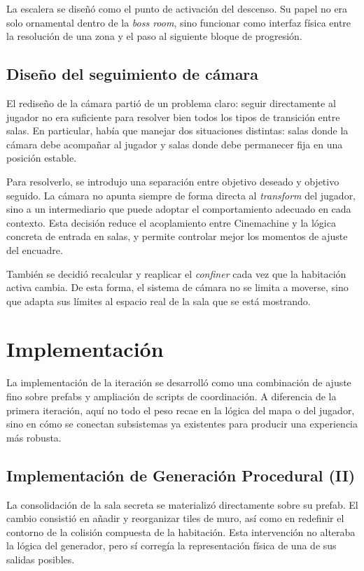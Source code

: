 La escalera se diseñó como el punto de activación del descenso. Su papel no era solo
ornamental dentro de la \textit{boss room}, sino funcionar como interfaz física entre la
resolución de una zona y el paso al siguiente bloque de progresión.

\subsection{Diseño del seguimiento de cámara}
El rediseño de la cámara partió de un problema claro: seguir directamente al jugador no era
suficiente para resolver bien todos los tipos de transición entre salas. En particular,
había que manejar dos situaciones distintas: salas donde la cámara debe acompañar al
jugador y salas donde debe permanecer fija en una posición estable.

Para resolverlo, se introdujo una separación entre objetivo deseado y objetivo seguido. La
cámara no apunta siempre de forma directa al \textit{transform} del jugador, sino a un
intermediario que puede adoptar el comportamiento adecuado en cada contexto. Esta decisión
reduce el acoplamiento entre Cinemachine y la lógica concreta de entrada en salas, y
permite controlar mejor los momentos de ajuste del encuadre.

También se decidió recalcular y reaplicar el \textit{confiner} cada vez que la habitación
activa cambia. De esta forma, el sistema de cámara no se limita a moverse, sino que adapta
sus límites al espacio real de la sala que se está mostrando.

\section{Implementación}
La implementación de la iteración se desarrolló como una combinación de ajuste fino sobre
prefabs y ampliación de scripts de coordinación. A diferencia de la primera iteración, aquí
no todo el peso recae en la lógica del mapa o del jugador, sino en cómo se conectan
subsistemas ya existentes para producir una experiencia más robusta.

\subsection{Implementación de Generación Procedural (II)}
La consolidación de la sala secreta se materializó directamente sobre su prefab. El cambio
consistió en añadir y reorganizar tiles de muro, así como en redefinir el contorno de la
colisión compuesta de la habitación. Esta intervención no alteraba la lógica del generador,
pero sí corregía la representación física de una de sus salidas posibles.

